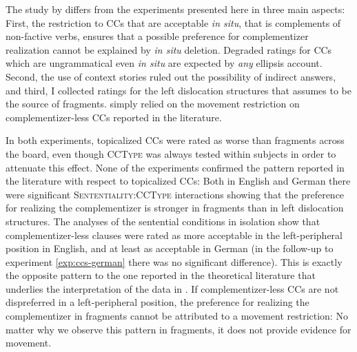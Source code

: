The study by \citet{merchant.etal2013} differs from the experiments presented here in three main aspects: First, the restriction to CCs that are acceptable \textit{in situ}, that is complements of non-factive verbs, ensures that a possible preference for complementizer realization cannot be explained by \textit{in situ} deletion. Degraded ratings for CCs which are ungrammatical even \textit{in situ} are expected by \textit{any} ellipsis account. Second, the use of context stories ruled out the possibility of indirect answers, and third, I collected ratings for the left dislocation structures that \citet{merchant2004} assumes to be the source of fragments. \citet{merchant.etal2013} simply relied on the movement restriction on complementizer-less CCs reported in the literature. 

In both experiments, topicalized CCs were rated as worse than fragments across the board, even though \textsc{CCType} was always tested within subjects in order to attenuate this effect. None of the experiments confirmed the pattern reported in the literature with respect to topicalized CCs: Both in English and German there were significant \textsc{Sententiality:CCType} interactions showing that the preference for realizing the complementizer is stronger in fragments than in left dislocation structures. The analyses of the sentential conditions in isolation show that complementizer-less clauses were rated as more acceptable in the left-peripheral position in English, and at least as acceptable in German (in the follow-up to experiment \ref{exp:ccs-german} there was no significant difference). This is exactly the opposite pattern to the one reported in the theoretical literature that underlies the interpretation of the data in \citet{merchant.etal2013}. If complementizer-less CCs are not dispreferred in a left-peripheral position, the preference for realizing the complementizer in fragments cannot be attributed to a movement restriction: No matter why we observe this pattern in fragments, it does not provide evidence for movement.

